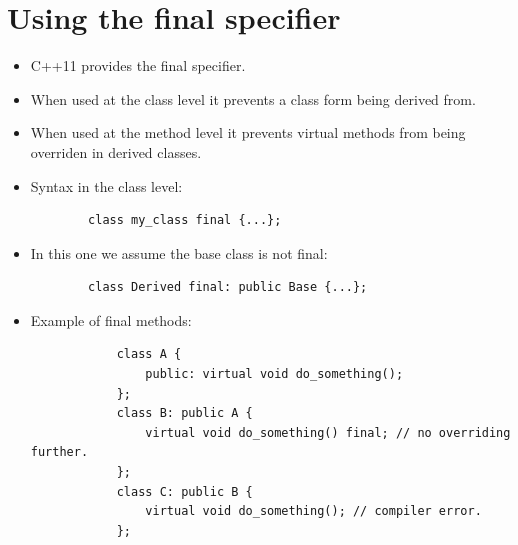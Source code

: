 \section{Using the final specifier}
\begin{itemize}
    \item C++11 provides the final specifier.
    \item When used at the class level it prevents a class form being derived from.
    \item When used at the method level it prevents virtual methods from being overriden in derived classes.
    \item Syntax in the class level: \begin{verbatim}
        class my_class final {...};
    \end{verbatim}
    
    \item In this one we assume the base class is not final: \begin{verbatim}
        class Derived final: public Base {...};
    \end{verbatim}
    
    \item Example of final methods:
        \begin{verbatim}
            class A {
                public: virtual void do_something();
            };
            class B: public A {
                virtual void do_something() final; // no overriding further.
            };
            class C: public B {
                virtual void do_something(); // compiler error.
            };
        \end{verbatim}
\end{itemize}

